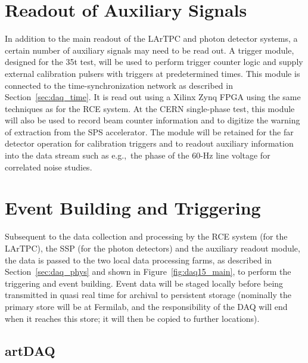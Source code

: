 \section{Readout of Auxiliary Signals}
\label{sec:daq_penn}

In addition to the main readout of the LArTPC and photon detector
systems, a certain number of auxiliary signals may need to be read
out.  A trigger module, designed for the 35t test,  will be
used to perform trigger counter logic and supply external calibration
pulsers with triggers at predetermined times.  This module is
connected to the time-synchronization network as described in Section~\ref{sec:daq_time}. %
It is read out using a Xilinx Zynq FPGA using the same techniques as for
the RCE system.   At the CERN single-phase test, this module will also be used to
record beam counter information and to digitize the warning of
extraction from the SPS accelerator.  The module will be retained for
the far detector operation for calibration triggers and to readout auxiliary information into the
data stream such as e.g.,\ the phase of the 60-Hz line voltage for
correlated noise studies.  

\section{Event Building and Triggering}
\label{sec:daq_artDAQ}

Subsequent to the data collection and processing by the RCE system
(for the LArTPC), the SSP (for the photon detectors) and the
auxiliary readout module, the data is passed to the two local data
processing farms, as described in Section~\ref{sec:daq_phys} and shown
in Figure~\ref{fig:daq15_main}, to perform the triggering and event
building.  Event data will be staged locally before being transmitted
in quasi real time for archival to persistent storage (nominally the
primary store will be at Fermilab, and the responsibility of the DAQ
will end when it reaches this store; it will then be copied to further
locations).

\subsection{artDAQ}


